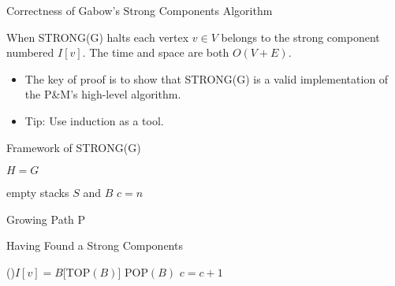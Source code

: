 \documentclass{beamer}
\begin{document}
\begin{frame}{Correctness of Gabow's Strong Components Algorithm}
	\begin{theorem}
		When STRONG(G) halts each vertex $v\in V$ belongs to the strong component numbered $I[v]$.
		The time and space are both $O(V+E)$.
	\end{theorem}
	\begin{itemize}
		\item
		The key of proof is to show that STRONG(G) is a valid implementation of the P\&M's high-level algorithm.
		\item
		Tip: Use induction as a tool.
	\end{itemize}
\end{frame}

\begin{frame}{Framework of STRONG(G)}
	\SetAlFnt{\small}
	\begin{algorithm}[H]
		\caption{Strong components: Main-DFS(G) (DFS caller)}
		$H=G$\;
	\end{algorithm}
	\begin{procedure}[H]
		\caption{STRONG(G)}
		empty stacks $S$ and $B$\;
		$c=n$\;
	\end{procedure}
\end{frame}

\begin{frame}{Growing Path P}
	\SetAlFnt{\small}
	\begin{algorithm}[H]
		\caption{A Part of High-Level Algorithm}
	\end{algorithm}
	\begin{procedure}[H]
		\caption{A Part of DFS(v)}
	\end{procedure}
\end{frame}

\begin{frame}{Having Found a Strong Components}
	\SetAlFnt{\small}
	\begin{algorithm}[H]
		\caption{A Part of High-Level Algorithm}
	\end{algorithm}
	\begin{procedure}[H]
		\caption{A Part of DFS(v)}
		\If(){$I[v]=B[$TOP$(B)]$} {
			POP$(B)$\;
			$c = c + 1$\;
		}
	\end{procedure}
\end{frame}
\end{document}
